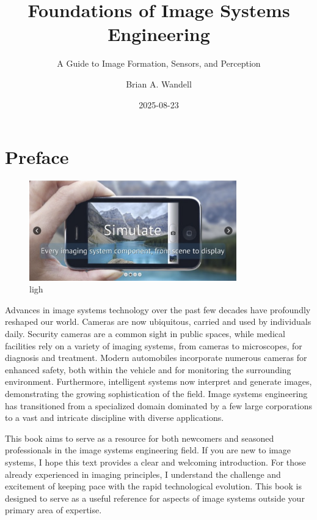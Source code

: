 \documentclass[
  letterpaper,
]{book}
\title{Foundations of Image Systems Engineering}
\subtitle{A Guide to Image Formation, Sensors, and Perception}
\author{Brian A. Wandell}
\date{2025-08-23}
\renewcommand*\contentsname{Table of contents}
\newcommand\contentsname{Table of contents}
\begin{document}
\frontmatter
\maketitle

\renewcommand*\contentsname{Table of contents}
{
\setcounter{tocdepth}{2}
\tableofcontents
}

\mainmatter
{}

\chapter*{Preface}\label{sec-preface}


\begin{figure}[H]

{\centering \includegraphics[width=0.8\textwidth,height=\textheight]{chapters/images/front-simulate.png}

}

\caption{ligh}

\end{figure}%

Advances in image systems technology over the past few decades have
profoundly reshaped our world. Cameras are now ubiquitous, carried and
used by individuals daily. Security cameras are a common sight in public
spaces, while medical facilities rely on a variety of imaging systems,
from cameras to microscopes, for diagnosis and treatment. Modern
automobiles incorporate numerous cameras for enhanced safety, both
within the vehicle and for monitoring the surrounding environment.
Furthermore, intelligent systems now interpret and generate images,
demonstrating the growing sophistication of the field. Image systems
engineering has transitioned from a specialized domain dominated by a
few large corporations to a vast and intricate discipline with diverse
applications.

This book aims to serve as a resource for both newcomers and seasoned
professionals in the image systems engineering field. If you are new to
image systems, I hope this text provides a clear and welcoming
introduction. For those already experienced in imaging principles, I
understand the challenge and excitement of keeping pace with the rapid
technological evolution. This book is designed to serve as a useful
reference for aspects of image systems outside your primary area of
expertise.
\end{document}
